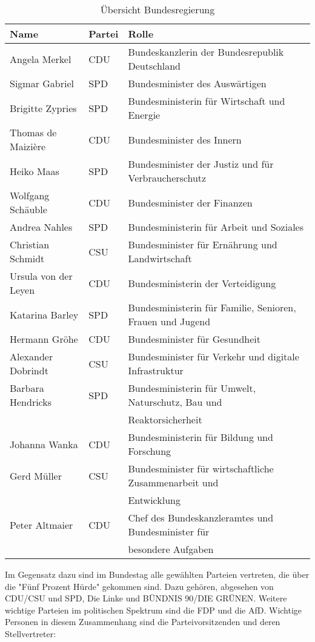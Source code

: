 \begin{table}
\begin{tabular}{lll}
\hline
Name & Partei & Rolle \\
\hline
Angela Merkel & CDU & Bundeskanzlerin der Bundesrepublik Deutschland \\
Sigmar Gabriel & SPD & Bundesminister des Auswärtigen \\
Brigitte Zypries & SPD & Bundesministerin für Wirtschaft und Energie \\
Thomas de Maizière & CDU & Bundesminister des Innern \\
Heiko Maas & SPD & Bundesminister der Justiz und für Verbraucherschutz \\
Wolfgang Schäuble & CDU & Bundesminister der Finanzen \\
Andrea Nahles & SPD & Bundesministerin für Arbeit und Soziales \\
Christian Schmidt & CSU & Bundesminister für Ernährung und Landwirtschaft \\
Ursula von der Leyen & CDU & Bundesministerin der Verteidigung \\
Katarina Barley  & SPD & Bundesministerin für Familie, Senioren, Frauen und Jugend \\
Hermann Gröhe & CDU & Bundesminister für Gesundheit \\
Alexander Dobrindt & CSU & Bundesminister für Verkehr und digitale Infrastruktur \\
Barbara Hendricks & SPD & Bundesministerin für Umwelt, Naturschutz, Bau und  \\
& & Reaktorsicherheit \\
Johanna Wanka & CDU & Bundesministerin für Bildung und Forschung \\
Gerd Müller & CSU & Bundesminister für wirtschaftliche Zusammenarbeit und \\
& & Entwicklung \\
Peter Altmaier & CDU & Chef des Bundeskanzleramtes und Bundesminister für  \\
& & besondere Aufgaben \\
\hline
\end{tabular}
\caption{ \label{bundesregierung} Übersicht Bundesregierung}
\end{table}
Im Gegensatz dazu sind im Bundestag alle gewählten Parteien vertreten, die über die "Fünf Prozent Hürde" gekommen sind. Dazu gehören, abgesehen von CDU/CSU und SPD, Die Linke und BÜNDNIS 90/DIE GRÜNEN. Weitere wichtige Parteien im politischen Spektrum sind die FDP und die AfD. Wichtige Personen in diesem Zusammenhang sind die Parteivorsitzenden und deren Stellvertreter: \\
